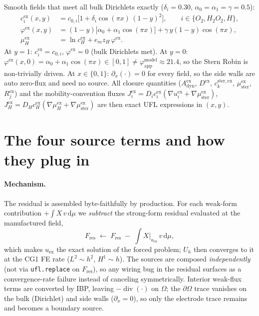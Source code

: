 \documentclass[11pt]{article}
\DeclareMathOperator{\divg}{div}
\newcommand{\ster}{\mathrm{ster}}
\newcommand{\dyn}{\mathrm{dyn}}
\newcommand{\app}{\mathrm{app}}
\newcommand{\modl}{\mathrm{model}}
\newcommand{\ex}{\mathrm{ex}}
\begin{document}
Smooth fields that meet all bulk Dirichlets exactly
($\delta_i=0.30$, $\alpha_0=\alpha_1=\gamma=0.5$):
\begin{align*}
  c_i^\ex(x,y) &= c_{0,i}\bigl[1 + \delta_i\cos(\pi x)\,(1-y)^2\bigr],
    \qquad i\in\{O_2,H_2O_2,H\},\\
  \varphi^\ex(x,y) &= (1-y)\bigl[\alpha_0+\alpha_1\cos(\pi x)\bigr]
    + \gamma\,y(1-y)\cos(\pi x),\\
  \mu_H^\ex &= \ln c_H^\ex + e_m z_H\,\varphi^\ex .
\end{align*}
At $y=1$: $c_i^\ex=c_{0,i}$, $\varphi^\ex=0$ (bulk Dirichlets met). At
$y=0$: $\varphi^\ex(x,0)=\alpha_0+\alpha_1\cos(\pi x)\in[0,1]\neq
\varphi_\app^\modl\approx21.4$, so the Stern Robin is non-trivially driven.
At $x\in\{0,1\}$: $\partial_x(\cdot)=0$ for every field, so the side walls
are auto zero-flux and need no source. All closure quantities
($A_\dyn^\ex$, $D^\ex$, $c_k^{\ster,\ex}$, $\mu_\ster^\ex$, $R_j^\ex$) and the
mobility-convention fluxes
$J_i^\ex = D_i c_i^\ex(\nabla u_i^\ex + \nabla\mu_\ster^\ex)$,
$J_H^\ex = D_H c_H^\ex(\nabla\mu_H^\ex + \nabla\mu_\ster^\ex)$ are then exact
UFL expressions in $(x,y)$.

\section{The four source terms and how they plug in}

\paragraph{Mechanism.} The residual is assembled byte-faithfully by
production. For each weak-form contribution $+\int X\,v\,\mathrm{d}\mu$ we
\emph{subtract} the strong-form residual evaluated at the manufactured
field,
\[
  F_\mathrm{res} \;\leftarrow\; F_\mathrm{res} \;-\;\int X\big|_{u_\ex}\,v\,\mathrm{d}\mu ,
\]
which makes $u_\ex$ the exact solution of the forced problem; $U_h$ then
converges to it at the CG1 FE rate ($L^2\!\sim\!h^2$, $H^1\!\sim\!h$). The
sources are composed \emph{independently} (not via \verb|ufl.replace| on
$F_\mathrm{res}$), so any wiring bug in the residual surfaces as a
convergence-rate failure instead of canceling symmetrically. Interior
weak-flux terms are converted by IBP, leaving $-\divg(\cdot)$ on $\Omega$;
the $\partial\Omega$ trace vanishes on the bulk (Dirichlet) and side walls
($\partial_x=0$), so only the electrode trace remains and becomes a boundary
source.
\end{document}
